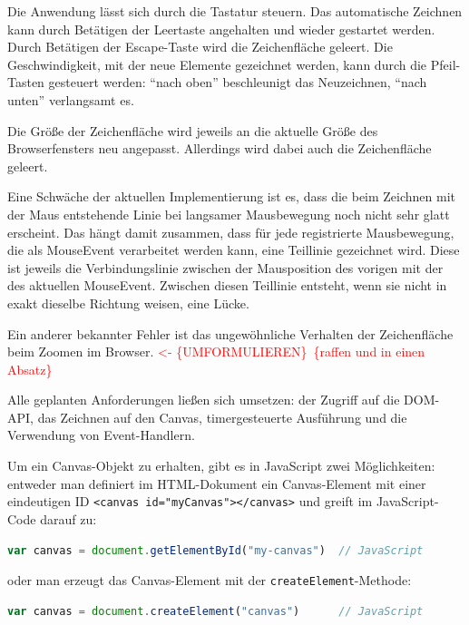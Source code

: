 \documentclass[a4paper, 12pt, hidelinks, listof=totoc, listoftables=totoc, bibliography=totoc]{scrreprt}
\newcommand{\js}[1]{\lstinline[language=JavaScript, style=inline]|#1|}
\newcommand{\html}[1]{\lstinline[language=HTML5, style=inline]|#1|}
\newcommand{\TODOi}[1]{\textcolor{red}{\{#1\}}}
\newcommand{\REDOi}{\textcolor{red}{<- \{UMFORMULIEREN\}~}}
\begin{document}
Die Anwendung lässt sich durch die Tastatur steuern. Das automatische Zeichnen kann durch Betätigen der Leertaste angehalten und wieder gestartet werden. Durch Betätigen der Escape-Taste wird die Zeichenfläche geleert. Die Geschwindigkeit, mit der neue Elemente gezeichnet werden, kann durch die Pfeil-Tasten gesteuert werden: "`nach oben"' beschleunigt das Neuzeichnen, "`nach unten"' verlangsamt es.

Die Größe der Zeichenfläche wird jeweils an die aktuelle Größe des Browserfensters neu angepasst. Allerdings wird dabei auch die Zeichenfläche geleert.

Eine Schwäche der aktuellen Implementierung ist es, dass die beim Zeichnen mit der Maus entstehende Linie bei langsamer Mausbewegung noch nicht sehr glatt erscheint. Das hängt damit zusammen, dass für jede registrierte Mausbewegung, die als MouseEvent verarbeitet werden kann, eine Teillinie gezeichnet wird. Diese ist jeweils die Verbindungslinie zwischen der Mausposition des vorigen mit der des aktuellen MouseEvent. Zwischen diesen Teillinie entsteht, wenn sie nicht in exakt dieselbe Richtung weisen, eine Lücke.

Ein anderer bekannter Fehler ist das ungewöhnliche Verhalten der Zeichenfläche beim Zoomen im Browser. \REDOi \TODOi{raffen und in einen Absatz}



Alle geplanten Anforderungen ließen sich umsetzen: der Zugriff auf die \ac{DOM}-\ac{API}, das Zeichnen auf den Canvas, timergesteuerte Ausführung und die Verwendung von Event-Handlern.

Um ein Canvas-Objekt zu erhalten, gibt es in JavaScript zwei Möglichkeiten: entweder man definiert im \ac{HTML}-Dokument ein Canvas-Element mit einer eindeutigen ID \html{<canvas id="myCanvas"></canvas>} und greift im JavaScript-Code darauf zu:

\begin{lstlisting}[language=JavaScript, style=snippet]
var canvas = document.getElementById("my-canvas")  // JavaScript
\end{lstlisting}

oder man erzeugt das Canvas-Element mit der \js{createElement}-Methode:

\begin{lstlisting}[language=JavaScript, style=snippet]
var canvas = document.createElement("canvas")      // JavaScript
\end{lstlisting}
\end{document}
